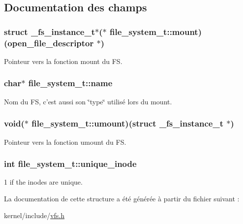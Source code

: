 \subsection{Documentation des champs}
\hypertarget{structfile__system__t_a7edaed95e6ac68991bbaac6cd07b458b}{
\subsubsection[{mount}]{\setlength{\rightskip}{0pt plus 5cm}struct {\bf \+\_\+fs\+\_\+instance\+\_\+t}$\ast$($\ast$ file\+\_\+system\+\_\+t\+::mount)({\bf open\+\_\+file\+\_\+descriptor} $\ast$)}}\label{structfile__system__t_a7edaed95e6ac68991bbaac6cd07b458b}
Pointeur vers la fonction mount du F\+S. \hypertarget{structfile__system__t_a2b7d7c0f769113d1164052beeeca777d}{
\subsubsection[{name}]{\setlength{\rightskip}{0pt plus 5cm}char$\ast$ file\+\_\+system\+\_\+t\+::name}}\label{structfile__system__t_a2b7d7c0f769113d1164052beeeca777d}
Nom du F\+S, c'est aussi son \char`\"{}type\char`\"{} utilisé lors du mount. \hypertarget{structfile__system__t_a899f34d838d88470373b60f7c5f0edd9}{
\subsubsection[{umount}]{\setlength{\rightskip}{0pt plus 5cm}void($\ast$ file\+\_\+system\+\_\+t\+::umount)(struct {\bf \+\_\+fs\+\_\+instance\+\_\+t} $\ast$)}}\label{structfile__system__t_a899f34d838d88470373b60f7c5f0edd9}
Pointeur vers la fonction umount du F\+S. \hypertarget{structfile__system__t_a3cf80f0c2c2b7a9c202d5006e4095eaf}{
\subsubsection[{unique\+\_\+inode}]{\setlength{\rightskip}{0pt plus 5cm}int file\+\_\+system\+\_\+t\+::unique\+\_\+inode}}\label{structfile__system__t_a3cf80f0c2c2b7a9c202d5006e4095eaf}
1 if the inodes are unique. 

La documentation de cette structure a été générée à partir du fichier suivant \+:\begin{DoxyCompactItemize}
\item 
kernel/include/\hyperlink{vfs_8h}{vfs.\+h}\end{DoxyCompactItemize}
